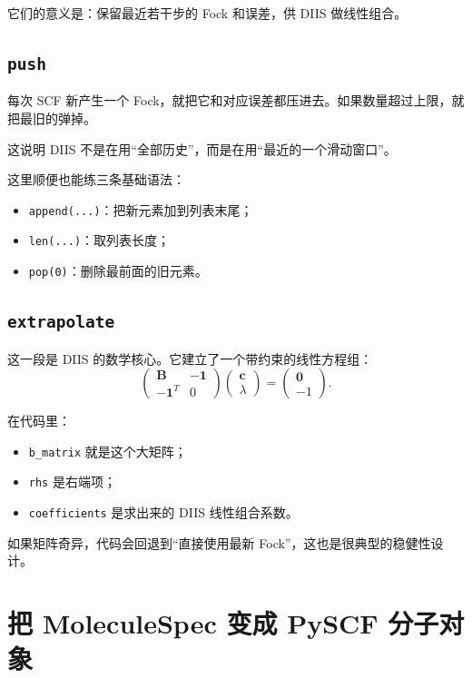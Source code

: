 \documentclass[UTF8,11pt,fontset=fandol]{ctexbook}
\begin{document}
它们的意义是：保留最近若干步的 Fock 和误差，供 DIIS 做线性组合。

\subsection*{\texttt{push}}

每次 SCF 新产生一个 Fock，就把它和对应误差都压进去。如果数量超过上限，就把最旧的弹掉。

这说明 DIIS 不是在用“全部历史”，而是在用“最近的一个滑动窗口”。

这里顺便也能练三条基础语法：
\begin{itemize}
  \item \texttt{append(...)}：把新元素加到列表末尾；
  \item \texttt{len(...)}：取列表长度；
  \item \texttt{pop(0)}：删除最前面的旧元素。
\end{itemize}

\subsection*{\texttt{extrapolate}}

这一段是 DIIS 的数学核心。它建立了一个带约束的线性方程组：
\begin{equation}
\begin{pmatrix}
\mathbf{B} & -\mathbf{1} \\
-\mathbf{1}^T & 0
\end{pmatrix}
\begin{pmatrix}
\mathbf{c} \\
\lambda
\end{pmatrix}
=
\begin{pmatrix}
\mathbf{0} \\
-1
\end{pmatrix}.
\end{equation}

在代码里：
\begin{itemize}
  \item \texttt{b\_matrix} 就是这个大矩阵；
  \item \texttt{rhs} 是右端项；
  \item \texttt{coefficients} 是求出来的 DIIS 线性组合系数。
\end{itemize}

如果矩阵奇异，代码会回退到“直接使用最新 Fock”，这也是很典型的稳健性设计。

\section{把 MoleculeSpec 变成 PySCF 分子对象}
\end{document}
